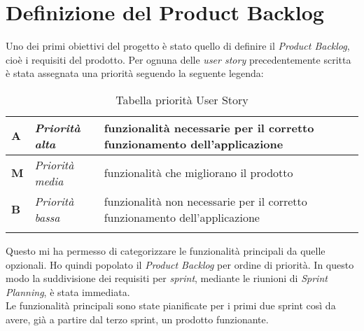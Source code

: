 \section{Definizione del Product Backlog}
Uno dei primi obiettivi del progetto è stato quello di definire il \emph{Product Backlog}, cioè i requisiti del prodotto. Per ognuna delle \emph{user story} precedentemente scritta è stata assegnata una priorità seguendo la seguente legenda:
\begin{longtable} {
		|>{\centering}p{10mm}| 
		|>{}p{25mm}|
		|>{}p{85mm}|
		>{}p{0mm}}
	\hline
	\textbf{A} & \textit{Priorità alta}  & funzionalità necessarie per il corretto funzionamento dell'applicazione \\ \hline
	\textbf{M} & \textit{Priorità media} & funzionalità che migliorano il prodotto \\ \hline
	\textbf{B} & \textit{Priorità bassa} & funzionalità non necessarie per il corretto funzionamento dell'applicazione \\ \hline
	\hline
	\caption{Tabella priorità User Story}
\end{longtable}
\noindent
Questo mi ha permesso di categorizzare le funzionalità principali da quelle opzionali. Ho quindi popolato il \emph{Product Backlog} per ordine di priorità. In questo modo la suddivisione dei requisiti per \emph{sprint}, mediante le riunioni di \textit{Sprint Planning}, è stata immediata. \\
Le funzionalità principali sono state pianificate per i primi due sprint così da avere, già a partire dal terzo sprint, un prodotto funzionante.

